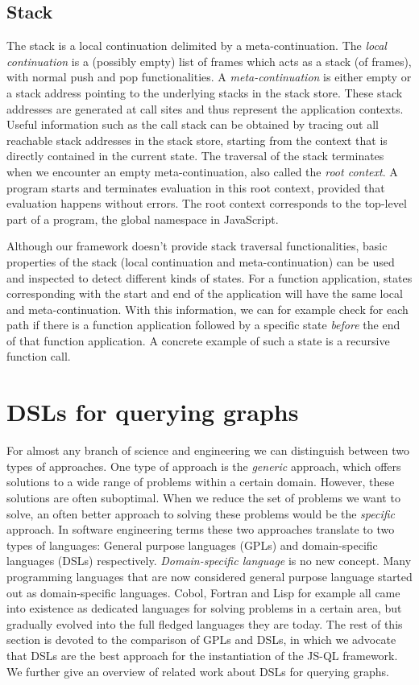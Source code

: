 \subsection*{Stack}

The stack is a local continuation delimited by a meta-continuation. The \textit{local continuation} is a (possibly empty) list of frames which acts as a stack (of frames), with normal push and pop functionalities. A \textit{meta-continuation} is either empty or a stack address pointing to the underlying stacks in the stack store. These stack addresses are generated at call sites and thus represent the application contexts. Useful information such as the call stack can be obtained by tracing out all reachable stack addresses in the stack store, starting from the context that is directly contained in the current state. The traversal of the stack terminates when we encounter an empty meta-continuation, also called the \textit{root context}. A program starts and terminates evaluation in this root context, provided that evaluation happens without errors. The root context corresponds to the top-level part of a program, the global namespace in JavaScript.

Although our framework doesn't provide stack traversal functionalities, basic properties of the stack (local continuation and meta-continuation) can be used and inspected to detect different kinds of states. For a function application, states corresponding with the start and end of the application will have the same local and meta-continuation. With this information, we can for example check for each path if there is a function application followed by a specific state \textit{before} the end of that function application. A concrete example of such a state is a recursive function call.

\section{DSLs for querying graphs}
\label{sec:DSLForQueryingGraphs}

For almost any branch of science and engineering we can distinguish between two types of approaches. One type of approach is the \textit{generic} approach, which offers solutions to a wide range of problems within a certain domain. However, these solutions are often suboptimal. When we reduce the set of problems we want to solve, an often better approach to solving these problems would be the \textit{specific} approach.
In software engineering terms these two approaches translate to two types of languages: General purpose languages (GPLs) and domain-specific languages (DSLs) respectively. 
\textit{Domain-specific language} is no new concept. Many programming languages that are now considered general purpose language started out as domain-specific languages. Cobol, Fortran and Lisp for example all came into existence as dedicated languages for solving problems in a certain area\cite{vanDeursen:2000}, but gradually evolved into the full fledged languages they are today. The rest of this section is devoted to the comparison of GPLs and DSLs, in which we advocate that DSLs are the best approach for the instantiation of the JS-QL framework. We further give an overview of related work about DSLs for querying graphs.


